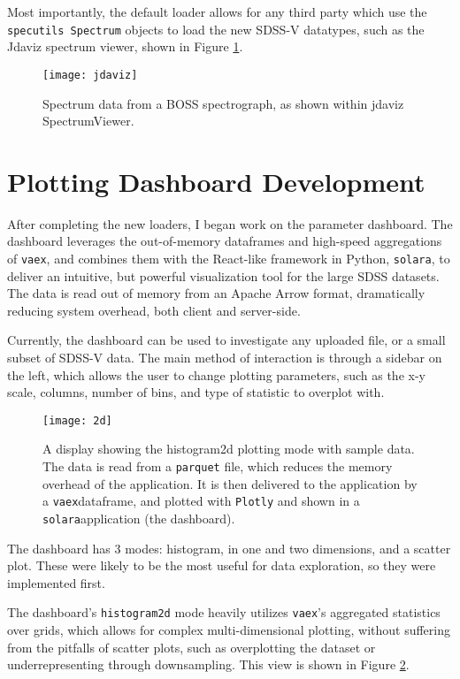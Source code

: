 \documentclass[a4paper,10pt,twocolumn]{article}
\newcommand{\solara}{\texttt{solara}}
\newcommand{\vaex}{\texttt{vaex}}
\begin{document}
Most importantly, the default loader allows for any third party which use the \texttt{specutils Spectrum} objects to load the new SDSS-V datatypes, such as the Jdaviz spectrum viewer, shown in Figure \ref{fig:jdaviz}.

\begin{figure}[htpb]
	\centering
	\texttt{[image: jdaviz]}
	\caption{Spectrum data from a BOSS spectrograph, as shown within jdaviz SpectrumViewer.}
	\label{fig:jdaviz}
\end{figure}

\section{Plotting Dashboard Development}
After completing the new loaders, I began work on the parameter dashboard. The dashboard leverages the out-of-memory dataframes and high-speed aggregations of \vaex, and combines them with the React-like framework in Python, \solara, to deliver an intuitive, but powerful visualization tool for the large SDSS datasets. The data is read out of memory from an Apache Arrow format, dramatically reducing system overhead, both client and server-side.

Currently, the dashboard can be used to investigate any uploaded file, or a small subset of SDSS-V data. The main method of interaction is through a sidebar on the left, which allows the user to change plotting parameters, such as the x-y scale, columns, number of bins, and type of statistic to overplot with.

\begin{figure}[htpb]
	\centering
	\texttt{[image: 2d]}
	\caption{A display showing the histogram2d plotting mode with sample data. The data is read from a \texttt{parquet} file, which reduces the memory overhead of the application. It is then delivered to the application by a \vaex dataframe, and plotted with \texttt{Plotly} and shown in a \solara application (the dashboard).}
	\label{fig:2d}
\end{figure}

The dashboard has 3 modes: histogram, in one and two dimensions, and a scatter plot. These were likely to be the most useful for data exploration, so they were implemented first.

The dashboard's \texttt{histogram2d} mode heavily utilizes \vaex's aggregated statistics over grids, which allows for complex multi-dimensional plotting, without suffering from the pitfalls of scatter plots, such as overplotting the dataset or underrepresenting through downsampling. This view is shown in Figure \ref{fig:2d}.
\end{document}
